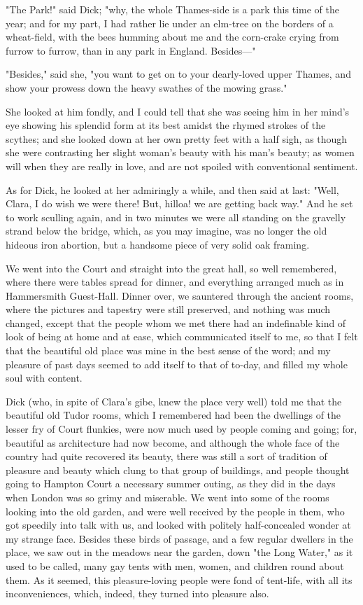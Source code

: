 "The Park!" said Dick; "why, the whole Thames-side is a park this time
of the year; and for my part, I had rather lie under an elm-tree on the
borders of a wheat-field, with the bees humming about me and the
corn-crake crying from furrow to furrow, than in any park in England.
Besides---"

"Besides," said she, "you want to get on to your dearly-loved upper
Thames, and show your prowess down the heavy swathes of the mowing
grass."

She looked at him fondly, and I could tell that she was seeing him in
her mind's eye showing his splendid form at its best amidst the rhymed
strokes of the scythes; and she looked down at her own pretty feet with
a half sigh, as though she were contrasting her slight woman's beauty
with his man's beauty; as women will when they are really in love, and
are not spoiled with conventional sentiment.

As for Dick, he looked at her admiringly a while, and then said at last:
"Well, Clara, I do wish we were there! But, hilloa! we are getting back
way." And he set to work sculling again, and in two minutes we were all
standing on the gravelly strand below the bridge, which, as you may
imagine, was no longer the old hideous iron abortion, but a handsome
piece of very solid oak framing.

We went into the Court and straight into the great hall, so well
remembered, where there were tables spread for dinner, and everything
arranged much as in Hammersmith Guest-Hall. Dinner over, we sauntered
through the ancient rooms, where the pictures and tapestry were still
preserved, and nothing was much changed, except that the people whom we
met there had an indefinable kind of look of being at home and at ease,
which communicated itself to me, so that I felt that the beautiful old
place was mine in the best sense of the word; and my pleasure of past
days seemed to add itself to that of to-day, and filled my whole soul
with content.

Dick (who, in spite of Clara's gibe, knew the place very well) told me
that the beautiful old Tudor rooms, which I remembered had been the
dwellings of the lesser fry of Court flunkies, were now much used by
people coming and going; for, beautiful as architecture had now become,
and although the whole face of the country had quite recovered its
beauty, there was still a sort of tradition of pleasure and beauty which
clung to that group of buildings, and people thought going to Hampton
Court a necessary summer outing, as they did in the days when London was
so grimy and miserable. We went into some of the rooms looking into the
old garden, and were well received by the people in them, who got
speedily into talk with us, and looked with politely half-concealed
wonder at my strange face. Besides these birds of passage, and a few
regular dwellers in the place, we saw out in the meadows near the
garden, down "the Long Water," as it used to be called, many gay tents
with men, women, and children round about them. As it seemed, this
pleasure-loving people were fond of tent-life, with all its
inconveniences, which, indeed, they turned into pleasure also.

